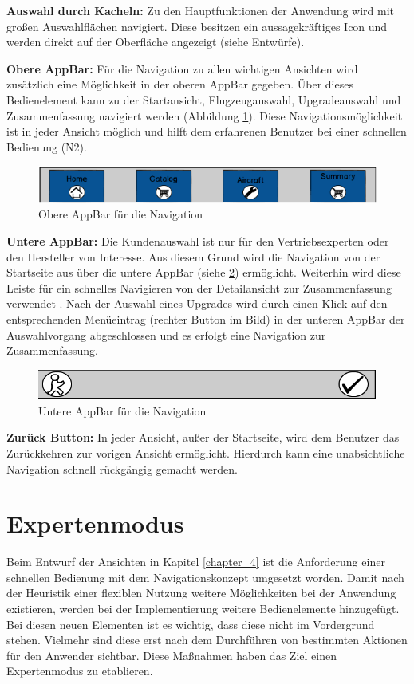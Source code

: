 \textbf{Auswahl durch Kacheln:} Zu den Hauptfunktionen der Anwendung wird mit großen Auswahlflächen navigiert. Diese besitzen ein aussagekräftiges Icon und werden direkt auf der Oberfläche angezeigt (siehe Entwürfe).  

\textbf{Obere AppBar:} Für die Navigation zu allen wichtigen Ansichten wird zusätzlich eine Möglichkeit in der oberen AppBar gegeben. Über dieses Bedienelement kann zu der Startansicht, Flugzeugauswahl, Upgradeauswahl und Zusammenfassung navigiert werden (Abbildung \ref{upperApp}). Diese Navigationsmöglichkeit ist in jeder Ansicht möglich und hilft dem erfahrenen Benutzer bei einer schnellen Bedienung (N2). \par
\begin{figure}[H]
\centering
\includegraphics[width=\hsize]{images/UpperAppBar}
\caption{Obere AppBar für die Navigation}
\label{upperApp}
\end{figure}
\textbf{Untere AppBar:} Die Kundenauswahl ist nur für den Vertriebsexperten oder den Hersteller von Interesse. Aus diesem Grund wird die Navigation von der Startseite aus über die untere AppBar (siehe \ref{lowerApp}) ermöglicht.  Weiterhin wird diese Leiste für ein schnelles Navigieren von der Detailansicht zur Zusammenfassung verwendet . Nach der Auswahl eines Upgrades wird durch einen Klick auf den entsprechenden Menüeintrag (rechter Button im Bild) in der unteren AppBar  der Auswahlvorgang abgeschlossen und es erfolgt eine Navigation zur Zusammenfassung.
\begin{figure}[H]
\centering
\includegraphics[width=\hsize]{images/LowerAppBar}
\caption{Untere AppBar für die Navigation}
\label{lowerApp}
\end{figure}
\textbf{Zurück Button:} In jeder Ansicht, außer der Startseite, wird dem Benutzer das Zurückkehren zur vorigen Ansicht ermöglicht. Hierdurch kann eine unabsichtliche Navigation schnell rückgängig gemacht werden.

\section{Expertenmodus}
Beim Entwurf der Ansichten in Kapitel \ref{chapter_4} ist die Anforderung einer schnellen Bedienung mit dem Navigationskonzept umgesetzt worden. Damit nach der Heuristik einer flexiblen Nutzung weitere Möglichkeiten bei der Anwendung existieren, werden bei der Implementierung weitere Bedienelemente hinzugefügt. Bei diesen neuen Elementen ist es wichtig, dass diese nicht im Vordergrund stehen. Vielmehr sind diese erst nach dem Durchführen von bestimmten Aktionen für den Anwender sichtbar. Diese Maßnahmen haben das Ziel einen Expertenmodus zu etablieren.

